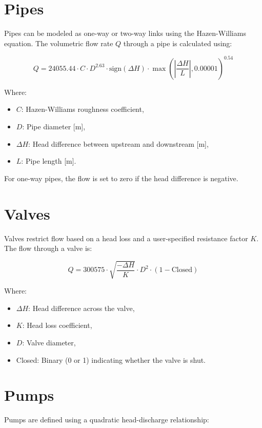 \documentclass[12pt]{report}
\begin{document}
\section{Pipes}
Pipes can be modeled as one-way or two-way links using the Hazen-Williams equation. The volumetric flow rate $Q$ through a pipe is calculated using:

\begin{equation}
Q = 24055.44 \cdot C \cdot D^{2.63} \cdot \text{sign}(\Delta H) \cdot \max\left(\left|\frac{\Delta H}{L}\right|, 0.00001\right)^{0.54}
\end{equation}

Where:
\begin{itemize}
\item $C$: Hazen-Williams roughness coefficient,
\item $D$: Pipe diameter [m],
\item $\Delta H$: Head difference between upstream and downstream [m],
\item $L$: Pipe length [m].
\end{itemize}

For one-way pipes, the flow is set to zero if the head difference is negative.

\section{Valves}
Valves restrict flow based on a head loss and a user-specified resistance factor $K$. The flow through a valve is:

\begin{equation}
Q = 300575 \cdot \sqrt{\frac{-\Delta H}{K}} \cdot D^2 \cdot (1 - \text{Closed})
\end{equation}

Where:
\begin{itemize}
\item $\Delta H$: Head difference across the valve,
\item $K$: Head loss coefficient,
\item $D$: Valve diameter,
\item Closed: Binary (0 or 1) indicating whether the valve is shut.
\end{itemize}

\section{Pumps}
Pumps are defined using a quadratic head-discharge relationship:
\end{document}
